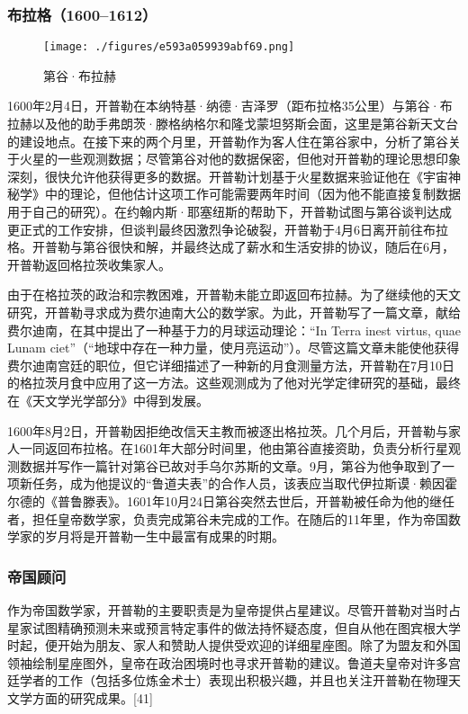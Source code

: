 \subsubsection{布拉格（1600–1612）}
\begin{figure}[ht]
\centering
\texttt{[image: ./figures/e593a059939abf69.png]}
\caption{第谷·布拉赫} \label{fig_KPL1_6}
\end{figure}
1600年2月4日，开普勒在本纳特基·纳德·吉泽罗（距布拉格35公里）与第谷·布拉赫以及他的助手弗朗茨·滕格纳格尔和隆戈蒙坦努斯会面，这里是第谷新天文台的建设地点。在接下来的两个月里，开普勒作为客人住在第谷家中，分析了第谷关于火星的一些观测数据；尽管第谷对他的数据保密，但他对开普勒的理论思想印象深刻，很快允许他获得更多的数据。开普勒计划基于火星数据来验证他在《宇宙神秘学》中的理论，但他估计这项工作可能需要两年时间（因为他不能直接复制数据用于自己的研究）。在约翰内斯·耶塞纽斯的帮助下，开普勒试图与第谷谈判达成更正式的工作安排，但谈判最终因激烈争论破裂，开普勒于4月6日离开前往布拉格。开普勒与第谷很快和解，并最终达成了薪水和生活安排的协议，随后在6月，开普勒返回格拉茨收集家人。

由于在格拉茨的政治和宗教困难，开普勒未能立即返回布拉赫。为了继续他的天文研究，开普勒寻求成为费尔迪南大公的数学家。为此，开普勒写了一篇文章，献给费尔迪南，在其中提出了一种基于力的月球运动理论：“In Terra inest virtus, quae Lunam ciet”（“地球中存在一种力量，使月亮运动”）。尽管这篇文章未能使他获得费尔迪南宫廷的职位，但它详细描述了一种新的月食测量方法，开普勒在7月10日的格拉茨月食中应用了这一方法。这些观测成为了他对光学定律研究的基础，最终在《天文学光学部分》中得到发展。

1600年8月2日，开普勒因拒绝改信天主教而被逐出格拉茨。几个月后，开普勒与家人一同返回布拉格。在1601年大部分时间里，他由第谷直接资助，负责分析行星观测数据并写作一篇针对第谷已故对手乌尔苏斯的文章。9月，第谷为他争取到了一项新任务，成为他提议的“鲁道夫表”的合作人员，该表应当取代伊拉斯谟·赖因霍尔德的《普鲁滕表》。1601年10月24日第谷突然去世后，开普勒被任命为他的继任者，担任皇帝数学家，负责完成第谷未完成的工作。在随后的11年里，作为帝国数学家的岁月将是开普勒一生中最富有成果的时期。
\subsubsection{帝国顾问}
作为帝国数学家，开普勒的主要职责是为皇帝提供占星建议。尽管开普勒对当时占星家试图精确预测未来或预言特定事件的做法持怀疑态度，但自从他在图宾根大学时起，便开始为朋友、家人和赞助人提供受欢迎的详细星座图。除了为盟友和外国领袖绘制星座图外，皇帝在政治困境时也寻求开普勒的建议。鲁道夫皇帝对许多宫廷学者的工作（包括多位炼金术士）表现出积极兴趣，并且也关注开普勒在物理天文学方面的研究成果。[41]

